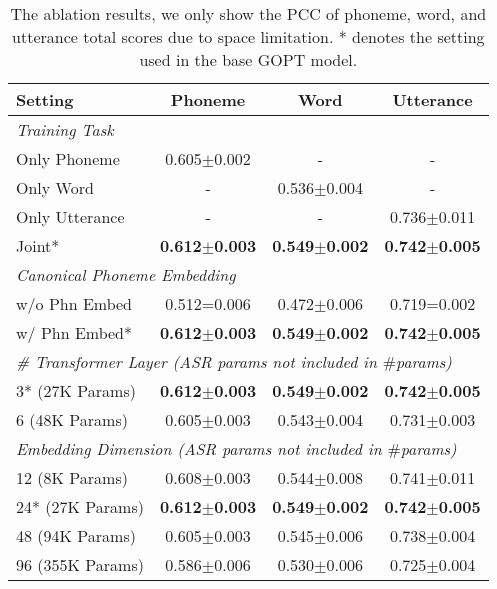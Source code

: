 \documentclass{article}
\begin{document}
\begin{table}[t]
\centering
\small
\setlength\tabcolsep{4.3pt}
\begin{tabular}{@{}lccc@{}}
\toprule
Setting         & Phoneme                & Word                 & Utterance            \\ \midrule
\multicolumn{4}{l}{\textit{Training Task}}                                                \\ \midrule
Only Phoneme      & 0.605$\pm$0.002          & -                     & -                     \\
Only Word       & -                     & 0.536$\pm$0.004          & -                     \\
Only Utterance  & -                     & -                     & 0.736$\pm$0.011          \\
Joint*          & \textbf{0.612$\pm$0.003} & \textbf{0.549$\pm$0.002} & \textbf{0.742$\pm$0.005} \\ \midrule
\multicolumn{4}{l}{\textit{Canonical Phoneme Embedding}}                                            \\ \midrule
w/o Phn Embed   & 0.512=0.006           & 0.472$\pm$0.006          & 0.719=0.002           \\
w/ Phn Embed*    & \textbf{0.612$\pm$0.003} & \textbf{0.549$\pm$0.002} & \textbf{0.742$\pm$0.005} \\ \midrule
\multicolumn{4}{l}{\textit{\# Transformer Layer (ASR params not included in $\#$params)}}                                       \\ \midrule
3* (27K Params)  & \textbf{0.612$\pm$0.003} & \textbf{0.549$\pm$0.002} & \textbf{0.742$\pm$0.005} \\
6 (48K Params)  & 0.605$\pm$0.003          & 0.543$\pm$0.004          & 0.731$\pm$0.003          \\ \midrule
\multicolumn{4}{l}{\textit{Embedding Dimension (ASR params not included in $\#$params)}}                            \\ \midrule
12 (8K Params)  & 0.608$\pm$0.003          & 0.544$\pm$0.008          & 0.741$\pm$0.011          \\
24* (27K Params) & \textbf{0.612$\pm$0.003} & \textbf{0.549$\pm$0.002} & \textbf{0.742$\pm$0.005} \\
48 (94K Params) & 0.605$\pm$0.003          & 0.545$\pm$0.006          & 0.738$\pm$0.004          \\
96 (355K Params) & 0.586$\pm$0.006          & 0.530$\pm$0.006          & 0.725$\pm$0.004          \\ \bottomrule
\end{tabular}
\caption{The ablation results, we only show the PCC of phoneme, word, and utterance total scores due to space limitation. * denotes the setting used in the base GOPT model.}
\label{tab:ablation}
\end{table}
\end{document}

